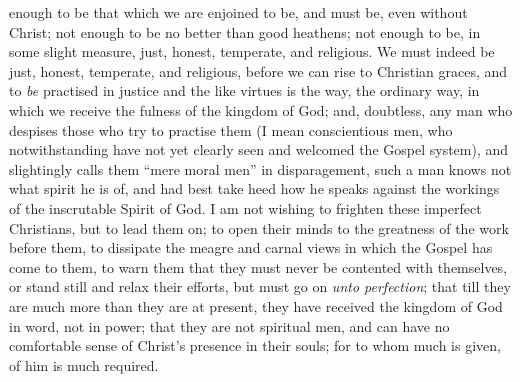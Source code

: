 enough to be that which we are enjoined to be, and must
be, even without Christ; not enough to be no better than
good heathens; not enough to be, in some slight measure,
just, honest, temperate, and religious. We must indeed be
just, honest, temperate, and religious, before we can
rise to Christian graces, and to \emph{be} practised in
justice and the like virtues is the way, the ordinary
way, in which we receive the fulness of the kingdom of
God; and, doubtless, any man who despises those who try
to practise them (I mean conscientious men, who
notwithstanding have not yet clearly seen and welcomed
the Gospel system), and slightingly calls them ``mere
moral men'' in disparagement, such a man knows not
what spirit he is of, and had best take heed how he
speaks against the workings of the inscrutable Spirit of
God. I am not wishing to frighten these imperfect
Christians, but to lead them on; to open their minds to
the greatness of the work before them, to dissipate the
meagre and carnal views in which the Gospel has come to
them, to warn them that they must never be contented with
themselves, or stand still and relax their efforts, but
must go on \emph{unto perfection}; that till they are
much more than they are at present, they have received
the kingdom of God in word, not in power; that they are
not spiritual men, and can have no comfortable sense of
Christ's presence in their souls; for to whom much is
given, of him is much required.

